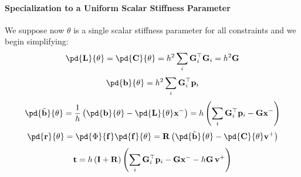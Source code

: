 \begin{derivation}
\paragraph{Specialization to a Uniform Scalar Stiffness Parameter}
\mbox{}

\noindent We suppose now $\theta$ is a single scalar stiffness parameter for all constraints and we begin simplifying:
\begin{equation*}
    \pd{\LL}{\theta} = \pd{\C}{\theta} = h^2\sum_i\G_i^\top\G_i = h^2\G
\end{equation*}
\begin{equation*}
    \pd{\bb}{\theta} = h^2\sum_i\G_i^\top\p_i 
\end{equation*}
\begin{equation*}
    \pd{\tilde\bb}{\theta} = \frac{1}{h}\left(\pd{\bb}{\theta} - \pd{\LL}{\theta}\x^-\right) = 
    h\left(\sum_i\G^\top_i\p_i - \G\x^-\right)
\end{equation*}
\begin{equation*}
    \pd{\rr}{\theta} = \pd{\Phi}{\f}\pd{\f}{\theta} = 
    \R \left(\pd{\tilde\bb}{\theta} - \pd{\C}{\theta}\vv^+\right)
\end{equation*}
\begin{equation}
    \mathbf{t}
    = h\,(\mathbf{I}+\mathbf{R})\left(
        \sum_i \mathbf{G}_i^\top\mathbf{p}_i
        - \mathbf{G}\mathbf{x}^-
        - h\mathbf{G}\,\mathbf{v}^+
      \right)
\end{equation}
\end{derivation}

